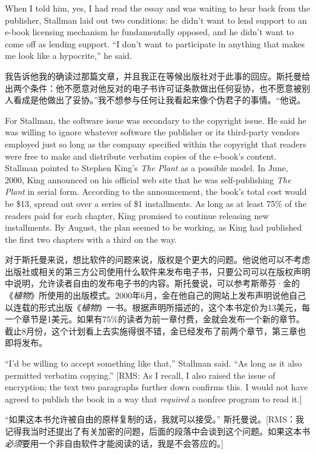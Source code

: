 \ifdefined\eng
When I told him, yes, I had read the essay and was waiting to hear back from the publisher, Stallman laid out two conditions: he didn't want to lend support to an e-book licensing mechanism he fundamentally opposed, and he didn't want to come off as lending support. ``I don't want to participate in anything that makes me look like a hypocrite,'' he said.
\fi

\ifdefined\chs
我告诉他我的确读过那篇文章，并且我正在等候出版社对于此事的回应。斯托曼给出两个条件：他不愿意对他反对的电子书许可证条款做出任何妥协，也不愿意被别人看成是他做出了妥协。”我不想参与任何让我看起来像个伪君子的事情。“他说。
\fi

\ifdefined\eng
For Stallman, the software issue was secondary to the copyright issue. He said he was willing to ignore whatever software the publisher or its third-party vendors employed just so long as the company specified within the copyright that readers were free to make and distribute verbatim copies of the e-book's content. Stallman pointed to Stephen King's \textit{The Plant} as a possible model. In June, 2000, King announced on his official web site that he was self-publishing \textit{The Plant} in serial form. According to the announcement, the book's total cost would be \$13, spread out over a series of \$1 installments. As long as at least 75\% of the readers paid for each chapter, King promised to continue releasing new installments. By August, the plan seemed to be working, as King had published the first two chapters with a third on the way.
\fi

\ifdefined\chs
对于斯托曼来说，想比软件的问题来说，版权是个更大的问题。他说他可以不考虑出版社或相关的第三方公司使用什么软件来发布电子书，只要公司可以在版权声明中说明，允许读者自由的发布电子书的内容。斯托曼说，可以参考斯蒂芬·金的《\textit{植物}》所使用的出版模式。2000年6月，金在他自己的网站上发布声明说他自己以连载的形式出版《\textit{植物}》一书。根据声明所描述的，这个本书定价为13美元，每一个章节是1美元。如果有75\%的读者为前一章付费，金就会发布一个新的章节。截止8月份，这个计划看上去实施得很不错，金已经发布了前两个章节，第三章也即将发布。
\fi

\ifdefined\eng
``I'd be willing to accept something like that,'' Stallman said. ``As long as it also permitted verbatim copying.'' [RMS: As I recall, I also raised the issue of encryption; the text two paragraphs further down confirms this.  I would not have agreed to publish the book in a way that \textit{required} a nonfree program to read it.]
\fi

\ifdefined\chs
“如果这本书允许被自由的原样复制的话，我就可以接受。” 斯托曼说。[RMS：我记得我当时还提出了有关加密的问题，后面的段落中会谈到这个问题。如果这本书\textit{必须}要用一个非自由软件才能阅读的话，我是不会答应的。]
\fi

